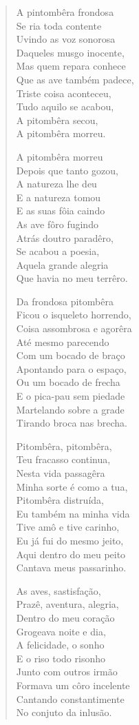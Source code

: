 \begin{verse}
A pintombêra frondosa\\
Se ria toda contente\\
Uvindo as voz sonorosa\\
Daqueles musgo inocente,\\
Mas quem repara conhece\\
Que as ave também padece,\\
Triste coisa aconteceu,\\
Tudo aquilo se acabou,\\
A pitombêra secou,\\
A pitombêra morreu.

A pitombêra morreu\\
Depois que tanto gozou,\\
A natureza lhe deu\\
E a natureza tomou\\
E as suas fôia caindo\\
As ave fôro fugindo\\
Atrás doutro paradêro,\\
Se acabou a poesia,\\
Aquela grande alegria\\
Que havia no meu terrêro.

Da frondosa pitombêra\\
Ficou o isqueleto horrendo,\\
Coisa assombrosa e agorêra\\
Até mesmo parecendo\\
Com um bocado de braço\\
Apontando para o espaço,\\
Ou um bocado de frecha\\
E o pica-pau sem piedade\\
Martelando sobre a grade\\
Tirando broca nas brecha.

Pitombêra, pitombêra,\\
Teu fracasso continua,\\
Nesta vida passagêra\\
Minha sorte é como a tua,\\
Pitombêra distruída,\\
Eu também na minha vida\\
Tive amô e tive carinho,\\
Eu já fui do mesmo jeito,\\
Aqui dentro do meu peito\\
Cantava meus passarinho.

As aves, sastisfação,\\
Prazê, aventura, alegria,\\
Dentro do meu coração\\
Grogeava noite e dia,\\
A felicidade, o sonho\\
E o riso todo risonho\\
Junto com outros irmão\\
Formava um côro incelente\\
Cantando constantimente\\
No conjuto da inlusão.


\end{verse}

